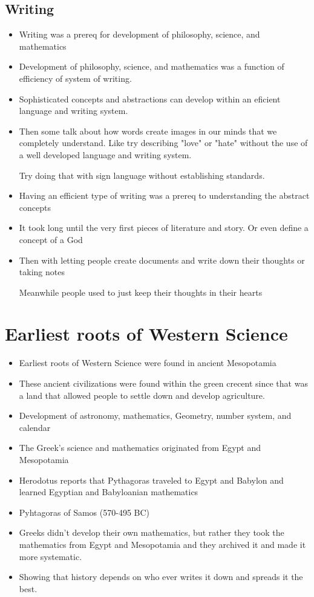 \documentclass{article}
\begin{document}
\subsection{Writing}
\begin{itemize}
  \item Writing was a prereq for development of philosophy, science, and mathematics
  \item Development of philosophy, science, and mathematics
    was a function of efficiency of system of writing.
  \item Sophisticated concepts and abstractions can develop within
    an eficient language and writing system.
  \item Then some talk about how words create images in our minds
    that we completely understand. Like try describing
    "love" or "hate" without the use of a well developed language
    and writing system.

    Try doing that with sign language without establishing standards.
  \item Having an efficient type of writing was a prereq to understanding
    the abstract concepts
  \item It took long until the very first pieces of literature and
    story. Or even define a concept of a God
  \item Then with letting people create documents and write
    down their thoughts or taking notes

    Meanwhile people used to just keep their thoughts in their hearts
\end{itemize}

\section{Earliest roots of Western Science}
\begin{itemize}
  \item Earliest roots of Western Science were found in ancient Mesopotamia
  \item These ancient civilizations were found within the green crecent
    since that was a land that allowed people to settle down
    and develop agriculture.
  \item Development of astronomy, mathematics, Geometry, number system, and calendar
  \item The Greek's science and mathematics originated from Egypt and Mesopotamia
  \item Herodotus reports that Pythagoras traveled to Egypt and Babylon and learned Egyptian and Babyloanian mathematics
  \item Pyhtagoras of Samos (570-495 BC)
  \item Greeks didn't develop their own mathematics, but rather
    they took the mathematics from Egypt and Mesopotamia
    and they archived it and made it more systematic.
  \item Showing that history depends on who ever writes it down
    and spreads it the best.
\end{itemize}
\end{document}
